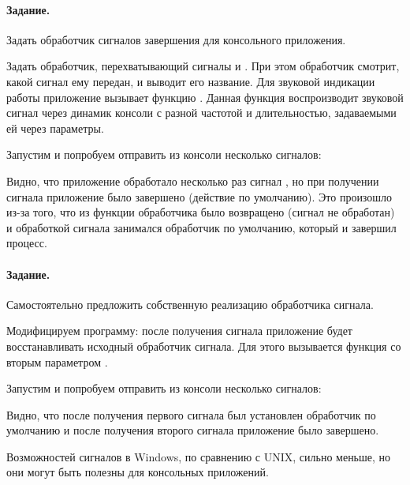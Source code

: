 \paragraph{Задание.} Задать обработчик сигналов завершения для консольного приложения.

Задать обработчик, перехватывающий сигналы \caret{} и \caret{}. При этом обработчик смотрит, какой сигнал ему передан, и выводит его название. Для звуковой индикации работы приложение вызывает функцию . Данная функция воспроизводит звуковой сигнал через динамик консоли с разной частотой и длительностью, задаваемыми ей через параметры.



Запустим  и попробуем отправить из консоли несколько сигналов:



Видно, что приложение обработало несколько раз сигнал \caret{}, но при получении сигнала  приложение было завершено (действие по умолчанию). Это произошло из-за того, что из функции обработчика было возвращено  (сигнал не обработан) и обработкой сигнала занимался обработчик по умолчанию, который и завершил процесс.

\paragraph{Задание.} Самостоятельно предложить собственную реализацию обработчика сигнала.

Модифицируем программу: после получения сигнала \caret{} приложение будет восстанавливать исходный обработчик сигнала. Для этого вызывается функция  со вторым параметром .



Запустим  и попробуем отправить из консоли несколько сигналов:



Видно, что после получения первого сигнала \caret{} был установлен обработчик по умолчанию и после получения второго сигнала приложение было завершено.

Возможностей сигналов в Windows, по сравнению с UNIX, сильно меньше, но они могут быть полезны для консольных приложений.

